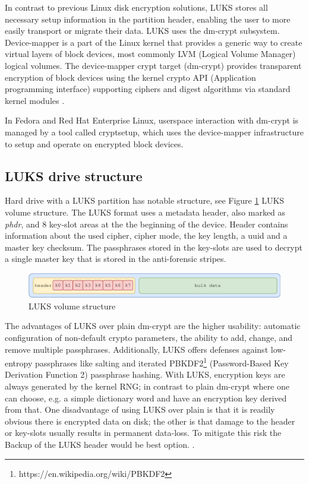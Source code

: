 In contrast to previous Linux disk encryption solutions, LUKS stores all necessary setup information in the partition header, enabling the user to more easily transport or migrate their data.
LUKS uses the dm-crypt subsystem.
Device-mapper is a part of the Linux kernel that provides a generic way to create virtual layers of block devices, most commonly LVM (Logical Volume Manager) logical volumes.
The device-mapper crypt target (dm-crypt) provides transparent encryption of block devices using the kernel crypto API (Application programming interface) supporting ciphers and digest algorithms via standard kernel modules \cite{fruhwirth2005luks}.

In Fedora and Red Hat Enterprise Linux, userspace interaction with dm-crypt is managed by a tool called cryptsetup, which uses the device-mapper infrastructure to setup and operate on encrypted block devices.

\subsection{LUKS drive structure}

Hard drive with a LUKS partition has notable structure, see Figure \ref{fig:luksvol} LUKS volume structure.
The LUKS format uses a metadata header, also marked as {\it phdr}, and 8 key-slot areas at the the beginning of the device.
Header contains information about the used cipher, cipher mode, the key length, a uuid and a master key checksum.
The passphrases stored in the key-slots are used to decrypt a single master key that is stored in the anti-forensic stripes.
\begin{figure}[h]
    \centering
    \includegraphics[scale=0.7]{figures/LUKSdrive.pdf}
    \caption{LUKS volume structure}
    \label{fig:luksvol}
\end{figure}
The advantages of LUKS over plain dm-crypt are the higher usability: automatic configuration of non-default crypto parameters, the ability to add, change, and remove multiple passphrases.
Additionally, LUKS offers defenses against low-entropy passphrases like salting and iterated PBKDF2\footnote{https://en.wikipedia.org/wiki/PBKDF2} (Password-Based Key Derivation Function 2) passphrase hashing.
With LUKS, encryption keys are always generated by the kernel RNG; in contrast to plain dm-crypt where one can choose, e.g. a simple dictionary word and have an encryption key derived from that.
One disadvantage of using LUKS over plain is that it is readily obvious there is encrypted data on disk; the other is that damage to the header or key-slots usually results in permanent data-loss.
To mitigate this risk the Backup of the LUKS header would be best option. \cite{LUKS}.

